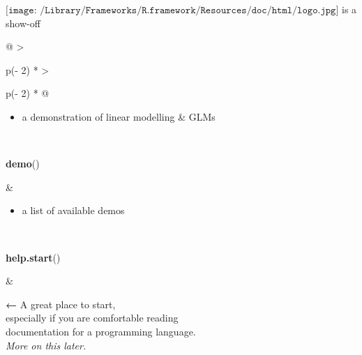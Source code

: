 \documentclass[
  11pt,
  ignorenonframetext,
]{beamer}
\newenvironment{Shaded}{\begin{snugshade}}{\end{snugshade}}
\newcommand{\FunctionTok}[1]{\textcolor[rgb]{0.13,0.29,0.53}{\textbf{#1}}}
\newcommand{\NormalTok}[1]{#1}
\providecommand{\tightlist}{%
  \setlength{\itemsep}{0pt}\setlength{\parskip}{0pt}}
\newlength\ShadedFrameSep
\begin{document}
\begin{frame}[fragile]{\(\texttt{[image: /Library/Frameworks/R.framework/Resources/doc/html/logo.jpg]}\)
is a show-off}
\begin{longtable}[]{@{}
  >{\raggedright\arraybackslash}p{(\columnwidth - 2\tabcolsep) * }
  >{\raggedright\arraybackslash}p{(\columnwidth - 2\tabcolsep) * }@{}}
\begin{minipage}[t]{\linewidth}
\begin{itemize}
\tightlist
\item
  a demonstration of linear modelling \& GLMs
\end{itemize}
\end{minipage} \\
\begin{minipage}[t]{\linewidth}\raggedright
\begin{Shaded}
\begin{Highlighting}[]
\FunctionTok{demo}\NormalTok{()}
\end{Highlighting}
\end{Shaded}
\end{minipage} & \begin{minipage}[t]{\linewidth}\raggedright
\begin{itemize}
\tightlist
\item
  a list of available demos
\end{itemize}
\end{minipage} \\
\begin{minipage}[t]{\linewidth}\raggedright
\begin{Shaded}
\begin{Highlighting}[]
\FunctionTok{help.start}\NormalTok{()}
\end{Highlighting}
\end{Shaded}
\end{minipage} & \begin{minipage}[t]{\linewidth}\raggedright
\vspace{\ShadedFrameSep}{}

\textbf{←} A great place to start,\\
\hspace*{0.333em}\hspace*{0.333em}\hspace*{0.333em}\hspace*{0.333em}especially
if you are comfortable reading\\
\hspace*{0.333em}\hspace*{0.333em}\hspace*{0.333em}\hspace*{0.333em}documentation
for a programming language.\\
\hspace*{0.333em}\hspace*{0.333em}\hspace*{0.333em}\hspace*{0.333em}\emph{More
on this later.}
\end{minipage} \\
\bottomrule\noalign{}
\end{longtable}


\end{frame}
\end{document}
